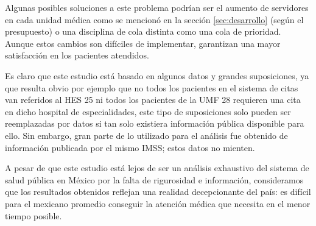 \documentclass[10pt]{article}
\begin{document}
    Algunas posibles soluciones a este problema podrían ser el aumento de servidores en cada unidad médica como se mencionó en la sección \ref{sec:desarrollo} (según el presupuesto) o una disciplina de cola distinta como una cola de prioridad. Aunque estos cambios son difíciles de implementar, garantizan una mayor satisfacción en los pacientes atendidos.
    
    Es claro que este estudio está basado en algunos datos y grandes suposiciones, ya que resulta obvio por ejemplo que no todos los pacientes en el sistema de citas van referidos al HES 25 ni todos los pacientes de la UMF 28 requieren una cita en dicho hospital de especialidades, este tipo de suposiciones solo pueden ser reemplazadas por datos si tan solo existiera información pública disponible para ello. Sin embargo, gran parte de lo utilizado para el análisis fue obtenido de información publicada por el mismo IMSS; estos datos no mienten.
    
    A pesar de que este estudio está lejos de ser un análisis exhaustivo del sistema de salud pública en México por la falta de rigurosidad e información, consideramos que los resultados obtenidos reflejan una realidad decepcionante del país: es difícil para el mexicano promedio conseguir la atención médica que necesita en el menor tiempo posible.
    
    
    
\end{document}
